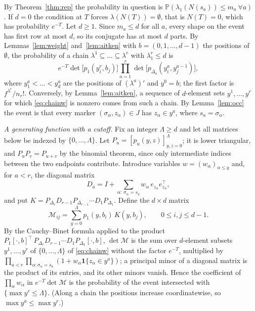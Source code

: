 \documentclass[11pt]{amsart}
\theoremstyle{remark}
\numberwithin{equation}{section}
\newcommand{\Pp}{\mathbb P}
\begin{document}
By Theorem~\ref{thm:rep} the probability in question is $\Pp(\lambda_1(N(s_a))\le m_a\ \forall a)$. If $d=0$ the condition at $T$ forces $\lambda(N(T))=\emptyset$, that is $N(T)=0$, which has probability $e^{-T}$. Let $d\ge1$. Since $m_a\le d$ for all $a$, every shape on the event has first row at most $d$, so its conjugate has at most $d$ parts. By Lemmas~\ref{lem:weight} and~\ref{lem:aitken} with $b=(0,1,\dots,d-1)$ the positions of $\emptyset$, the probability of a chain $\lambda^1\subseteq\dots\subseteq\lambda^r$ with $\lambda_1^r\le d$ is
\begin{equation}\label{eq:chainw}
e^{-T}\det\bigl[p_1(y^r_i,b_j)\bigr]\prod_{a=1}^r\det\bigl[p_{\Delta_a}(y^a_i,y^{a-1}_j)\bigr],
\end{equation}
where $y^a_1<\dots<y^a_d$ are the positions of $(\lambda^a)'$ and $y^0=b$; the first factor is $f^{\lambda^r}/n_r!$. Conversely, by Lemma~\ref{lem:aitken}, a sequence of $d$-element sets $y^1,\dots,y^r$ for which \eqref{eq:chainw} is nonzero comes from such a chain. By Lemma~\ref{lem:occ} the event is that every marker $(\sigma_\alpha,z_\alpha)\in J$ has $z_\alpha\in y^{a}$, where $s_a=\sigma_\alpha$.

\emph{A generating function with a cutoff.} Fix an integer $\Lambda\ge d$ and let all matrices below be indexed by $\{0,\dots,\Lambda\}$. Let $P_u=[p_u(y,z)]_{y,z=0}^\Lambda$; it is lower triangular, and $P_uP_v=P_{u+v}$ by the binomial theorem, since only intermediate indices between the two endpoints contribute. Introduce variables $w=(w_\alpha)_{\alpha\le q}$ and, for $a<r$, the diagonal matrix
\[
D_a=I+\sum_{\alpha:\ \sigma_\alpha=s_a}w_\alpha\,e_{z_\alpha}e_{z_\alpha}^{\top},
\]
and put $K=P_{\Delta_r}D_{r-1}P_{\Delta_{r-1}}\cdots D_1P_{\Delta_1}$. Define the $d\times d$ matrix
\[
\mathcal M_{ij}=\sum_{y=0}^{\Lambda}p_1(y,b_i)\,K(y,b_j),\qquad 0\le i,j\le d-1 .
\]
By the Cauchy--Binet formula applied to the product $P_1[\cdot,b]^{\top}\,P_{\Delta_r}D_{r-1}\cdots D_1P_{\Delta_1}[\cdot,b]$, $\det\mathcal M$ is the sum over $d$-element subsets $y^1,\dots,y^r$ of $\{0,\dots,\Lambda\}$ of \eqref{eq:chainw} without the factor $e^{-T}$, multiplied by $\prod_{a<r}\prod_{\alpha:\sigma_\alpha=s_a}(1+w_\alpha\mathbf 1\{z_\alpha\in y^a\})$; a principal minor of a diagonal matrix is the product of its entries, and its other minors vanish. Hence the coefficient of $\prod_\alpha w_\alpha$ in $e^{-T}\det\mathcal M$ is the probability of the event intersected with $\{\max y^r\le\Lambda\}$. (Along a chain the positions increase coordinatewise, so $\max y^a\le\max y^r$.)
\end{document}
